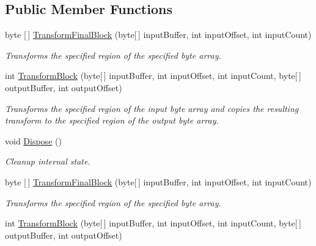 \subsection*{Public Member Functions}
\begin{DoxyCompactItemize}
\item 
byte \mbox{[}$\,$\mbox{]} \hyperlink{class_i_c_sharp_code_1_1_sharp_zip_lib_1_1_encryption_1_1_pkzip_classic_decrypt_crypto_transform_a1782e94e04349bbb85e60759bd2e3f83}{Transform\+Final\+Block} (byte\mbox{[}$\,$\mbox{]} input\+Buffer, int input\+Offset, int input\+Count)
\begin{DoxyCompactList}\small\item\em Transforms the specified region of the specified byte array. \end{DoxyCompactList}\item 
int \hyperlink{class_i_c_sharp_code_1_1_sharp_zip_lib_1_1_encryption_1_1_pkzip_classic_decrypt_crypto_transform_abc6a2c06b691296ae995aa670dc81ddd}{Transform\+Block} (byte\mbox{[}$\,$\mbox{]} input\+Buffer, int input\+Offset, int input\+Count, byte\mbox{[}$\,$\mbox{]} output\+Buffer, int output\+Offset)
\begin{DoxyCompactList}\small\item\em Transforms the specified region of the input byte array and copies the resulting transform to the specified region of the output byte array. \end{DoxyCompactList}\item 
void \hyperlink{class_i_c_sharp_code_1_1_sharp_zip_lib_1_1_encryption_1_1_pkzip_classic_decrypt_crypto_transform_a231f40f7c34ac196ca75b97363b8e63e}{Dispose} ()
\begin{DoxyCompactList}\small\item\em Cleanup internal state. \end{DoxyCompactList}\item 
byte \mbox{[}$\,$\mbox{]} \hyperlink{class_i_c_sharp_code_1_1_sharp_zip_lib_1_1_encryption_1_1_pkzip_classic_decrypt_crypto_transform_a1782e94e04349bbb85e60759bd2e3f83}{Transform\+Final\+Block} (byte\mbox{[}$\,$\mbox{]} input\+Buffer, int input\+Offset, int input\+Count)
\begin{DoxyCompactList}\small\item\em Transforms the specified region of the specified byte array. \end{DoxyCompactList}\item 
int \hyperlink{class_i_c_sharp_code_1_1_sharp_zip_lib_1_1_encryption_1_1_pkzip_classic_decrypt_crypto_transform_abc6a2c06b691296ae995aa670dc81ddd}{Transform\+Block} (byte\mbox{[}$\,$\mbox{]} input\+Buffer, int input\+Offset, int input\+Count, byte\mbox{[}$\,$\mbox{]} output\+Buffer, int output\+Offset)

\end{DoxyCompactItemize}
